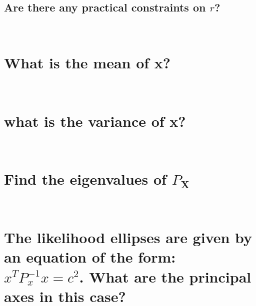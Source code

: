 \documentclass[12pt,letterpaper, onecolumn]{exam}
\begin{document}
\begin{questions}
\begin{parts}
        \part{Are there any practical constraints on $r$?}\\
		        \solution
    \end{parts}
    \clearpage
    \begin{parts}
        \part{What is the mean of x?}\\
		        \solution
        \part{what is the variance of x?}\\
		        \solution
    \end{parts}
    \clearpage
    \begin{parts}
        \part{Find the eigenvalues of $P_{\mathbf{X}}$}\\
		        \solution
        \part{The likelihood ellipses are given by an equation of the form: $x^T P^{-1}_x x = c^2$. What are the principal axes in this case?}\\
		        \solution

\end{parts}
\end{questions}
\end{document}
